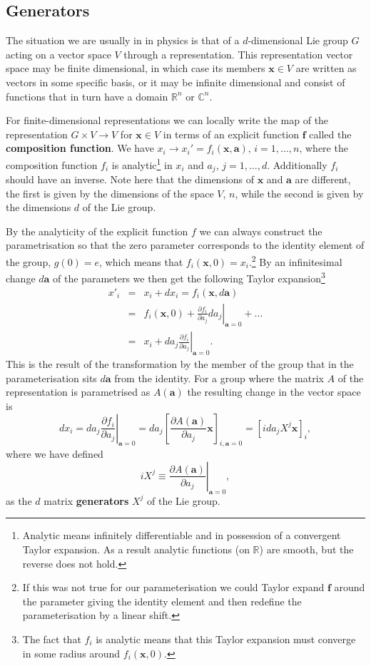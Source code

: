 \documentclass[notes.tex]{subfiles}
\begin{document}
\subsection{Generators}
\label{sec:generators}

The situation we are usually in in physics is that of a $d$-dimensional Lie group $G$ acting on a vector space $V$ through a representation. This representation vector space  may be finite dimensional, in which case its members $\mathbf x\in V$ are written as vectors in some specific basis, or it may be infinite dimensional and consist of functions that in turn have a domain $\mathbb R^n$ or $\mathbb C^n$.

For finite-dimensional representations we can locally write the map of the representation $G\times V \to V$ for $\mathbf{x} \in V$ in terms of an explicit function $\mathbf f$ called the {\bf composition function}. We have $x_i \to x_i' = f_i(\mathbf x, \mathbf a)$, $i=1, \ldots,n$, where the composition function $f_i$ is analytic\footnote{Analytic means infinitely differentiable and in possession of a  convergent Taylor expansion. As a result analytic functions (on $\mathbb{R}$) are smooth, but the reverse does not hold.} in $x_i$ and $a_j$, $j=1,\ldots,d$. Additionally $f_i$ should have an inverse. Note here that the dimensions of $\mathbf x$ and $\mathbf a$ are different, the first is given by the dimensions of the space $V$, $n$, while the second is given by the dimensions $d$ of the Lie group.

By the analyticity of the explicit function $f$ we can always construct the parametrisation so that the zero parameter corresponds to the identity element of the group, $g(0) = e$, which means that  $f_i(\mathbf x, 0)=x_i$.\footnote{If this was not true for our parameterisation we could Taylor expand $\mathbf f$ around the parameter giving the identity element and then redefine the parameterisation by a linear shift.} By an infinitesimal change $d\mathbf a$ of the  parameters we then get the following Taylor expansion\footnote{The fact that $f_i$ is analytic means that this Taylor expansion must converge in some radius around $f_i(\mathbf x,0)$.}
\begin{eqnarray*}
x'_i &=& x_i + dx_i = f_i(\mathbf x, d\mathbf a)\\
&=& f_i(\mathbf x, 0) + \left.\frac{\partial f_i}{\partial a_j}da_j\right|_{\mathbf a =0} +\ldots\\
&=& x_i +\left.da_j \frac{\partial f_i}{\partial a_j}\right|_{\mathbf a =0}.
\end{eqnarray*}
This is the result of the transformation by the member of the group that in the parameterisation sits $d\mathbf a$ from the identity. For a group where the matrix $A$ of the representation is parametrised as $A(\mathbf a)$ the resulting change in the vector space is
\[
dx_i=\left.da_j\frac{\partial f_i}{\partial a_j}\right|_{\mathbf a =0}=da_j\left[\frac{\partial A(\mathbf a)}{\partial a_j}\mathbf{x}\right]_{i,\mathbf a=0}=[ida_jX^j\mathbf{x}]_i,
\]
where we have defined 
\[
iX^j\equiv \left. \frac{\partial A(\mathbf a)}{\partial a_j}\right|_{\mathbf a=0} ,
\]
as the $d$ matrix {\bf generators} $X^j$ of the Lie group.
\end{document}
